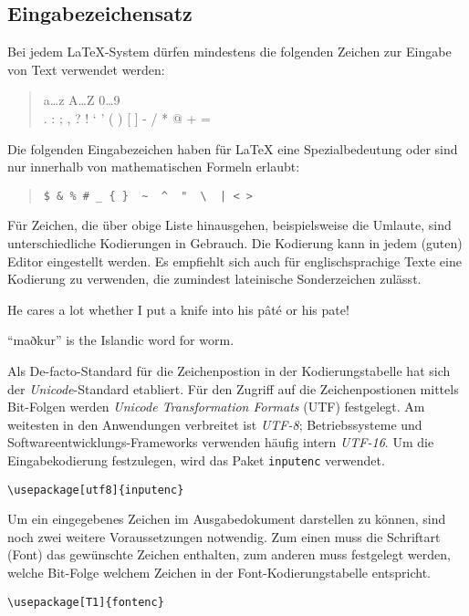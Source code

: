 \subsection{Eingabezeichensatz}\label{inputenc}

Bei jedem \LaTeX-System dürfen mindestens die folgenden Zeichen zur Eingabe von 
Text verwendet werden:
\begin{quote}
  \ttfamily
  a\dots z A\dots Z 0\dots 9 \\
  . : ; , ? ! ` ' ( ) [ ] - / * @ + =
\end{quote}
Die folgenden Eingabezeichen haben für \LaTeX{} eine Spezialbedeutung oder sind 
nur innerhalb von mathematischen Formeln erlaubt:
\begin{quote}
\verb.$ & % # _ { }  ~  ^  "  \  | < >.
\end{quote}
Für Zeichen, die über obige Liste hinausgehen, beispielsweise die Umlaute, sind 
unterschiedliche Kodierungen in
Gebrauch. 
Die Kodierung kann in jedem (guten) Editor eingestellt werden. Es empfiehlt sich auch für englischsprachige Texte eine Kodierung zu verwenden, die zumindest lateinische Sonderzeichen zulässt.

\begin{LTXexample}
He cares a lot whether 
I put a knife into 
his pâté or his pate!

``maðkur'' is the 
Islandic word for worm.
\end{LTXexample}


Als De-facto-Standard für die Zeichenpostion in der Kodierungstabelle hat sich der \emph{Unicode}-Standard etabliert. Für den Zugriff auf die Zeichenpostionen mittels Bit-Folgen werden \emph{Unicode Transformation Formats} (UTF) festgelegt. Am weitesten in den Anwendungen verbreitet ist \emph{UTF-8}; Betriebssysteme und Softwareentwicklungs-Frameworks verwenden häufig intern \emph{UTF-16}. Um die Eingabekodierung festzulegen, wird das Paket \texttt{inputenc} verwendet.

\begin{beispiel}
\lstinline+\usepackage[utf8]{inputenc}+
\end{beispiel}

Um ein eingegebenes Zeichen im Ausgabedokument darstellen zu können, sind noch zwei weitere Voraussetzungen notwendig. Zum einen muss die Schriftart (Font) das gewünschte Zeichen enthalten, zum anderen muss festgelegt werden, welche Bit-Folge welchem Zeichen in der Font-Kodierungstabelle entspricht.

\begin{beispiel}
\lstinline+\usepackage[T1]{fontenc}+
\end{beispiel}

